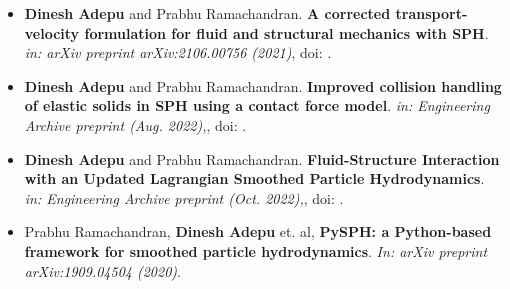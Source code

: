 %
%



\begin{itemize}
\item \textbf{Dinesh Adepu} and Prabhu Ramachandran. \textbf{A corrected transport-velocity
formulation for fluid and structural mechanics with SPH}. \emph{in: arXiv preprint
arXiv:2106.00756 (2021)}, doi: .

\item \textbf{Dinesh Adepu} and Prabhu Ramachandran. \textbf{Improved collision
  handling of elastic solids in SPH using a contact force model}. \emph{in:
    Engineering Archive preprint (Aug. 2022),}, doi: .

\item \textbf{Dinesh Adepu} and Prabhu Ramachandran. \textbf{Fluid-Structure
  Interaction with an Updated Lagrangian Smoothed Particle Hydrodynamics}.
  \emph{in: Engineering Archive preprint (Oct. 2022),}, doi: .

\item Prabhu Ramachandran, \textbf{Dinesh Adepu} et. al, \textbf{PySPH: a Python-based
  framework for smoothed particle hydrodynamics}. \emph{In: arXiv preprint
    arXiv:1909.04504 (2020)}.

\end{itemize}
